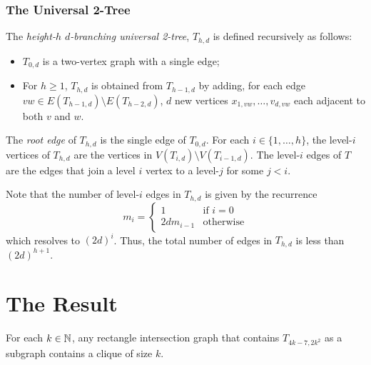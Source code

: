 \documentclass[lotsofwhite]{patmorin}
\newcommand{\iters}{2k^2}
\begin{document}
\subsubsection{The Universal 2-Tree}

The \emph{height-$h$ $d$-branching universal 2-tree}, $T_{h,d}$ is
defined recursively as follows:
\begin{itemize}
  \item $T_{0,d}$ is a two-vertex graph with a single edge;
  \item For $h\ge 1$, $T_{h,d}$ is obtained from $T_{h-1,d}$ by adding,
     for each edge $vw \in E(T_{h-1,d})\setminus E(T_{h-2,d})$, $d$
     new vertices $x_{1,vw},\ldots,v_{d,vw}$ each adjacent to both $v$
     and $w$.
\end{itemize}
The \emph{root edge} of $T_{h,d}$ is the single edge of $T_{0,d}$.
For each $i\in\{1,\ldots,h\}$, the level-$i$ vertices of $T_{h,d}$
are the vertices in $V(T_{i,d})\setminus V(T_{i-1,d})$.  The level-$i$
edges of $T$ are the edges that join a level $i$ vertex to a level-$j$
for some $j<i$.

Note that the number of level-$i$ edges in $T_{h,d}$ is given by the recurrence
\[
   m_i = \begin{cases}
           1 & \text{if $i=0$} \\
           2dm_{i-1} & \text{otherwise}
       \end{cases}
\]
which resolves to $(2d)^{i}$.  Thus, the total number of edges in
$T_{h,d}$ is less than $(2d)^{h+1}$.

\section{The Result}

\begin{thm}
  For each $k\in \mathbb{N}$, any rectangle intersection graph that contains
  $T_{4k-7,\iters}$ as a subgraph contains a clique of size $k$.
\end{thm}
\end{document}
